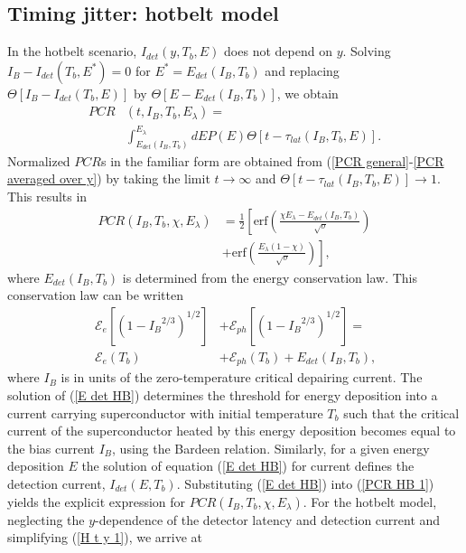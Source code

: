 \documentclass[%
reprint,
 amsmath,amssymb,
aps,
pra,
]{revtex4-1}
\begin{document}
\subsection{\label{sec:HBModel}Timing jitter: hotbelt model}

\quad In the hotbelt scenario, \(I_{det}\left(y, T_b,E\right)\) does not depend on \(y\). Solving \(I_B - I_{det}\left(T_b,E^*\right) = 0\) for \(E^*=E_{det}\left(I_B,T_b\right)\) and replacing \(\Theta\left[I_B-I_{det}(T_b,E)\right] \) by \(\Theta\left[E-E_{det}(I_B,T_b)\right] \), we obtain 
\begin{equation}\label{PCR HB}
\begin{aligned}
PCR&(t,I_B,T_b,E_\lambda)=\\
&\int_{E_{det}\left(I_B,T_b\right)}^{E_\lambda}dE P(E)\Theta\left[t - \tau_{lat}\left(I_B,T_b,E\right)\right].
\end{aligned}
\end{equation}
Normalized $PCR$s in the familiar form \cite{kozorezov_fano_2017} are obtained from (\ref{PCR general}-\ref{PCR averaged over y}) by taking the limit \(t \rightarrow \infty \) and \(\Theta\left[t - \tau_{lat}\left(I_B,T_b,E\right)\right]\rightarrow 1\).  This results in 
\begin{equation}\label{PCR HB 1}
\begin{aligned}
PCR(I_B,T_b,\chi,E_\lambda)&=\frac{1}{2}\left[\text{erf}\left(\frac{\chi E_\lambda - E_{det}\left(I_B,T_b\right)}{\sqrt[]{\sigma}}\right)\right.\\
&+\left. \text{erf}\left(\frac{E_\lambda\left(1 - \chi\right)}{\sqrt[]{\sigma}}\right)\right]\text{,}
\end{aligned}
\end{equation}
where \(E_{det}\left(I_B,T_b\right)\) is determined from the energy conservation law.  This conservation law can be written 
\begin{equation}\label{E det HB}
\begin{aligned}
\mathcal{E}_e\left[\left(1 - {I_B}^{2/3}\right)^{1/2}\right]& + \mathcal{E}_{ph}\left[\left(1 - {I_B}^{2/3}\right)^{1/2}\right] ={}\\
\mathcal{E}_e(T_b) &+ \mathcal{E}_{ph}(T_b) + E_{det}\left(I_B,T_b\right)\text{,}
\end{aligned}
\end{equation}
where \(I_B\) is in units of the zero-temperature critical depairing current. The solution of (\ref{E det HB}) determines the threshold for energy deposition into a current carrying superconductor with initial temperature \(T_b\) such that the critical current of the superconductor heated by this energy deposition becomes equal to the bias current \(I_B\),  using the Bardeen relation. Similarly, for a given energy deposition \(E\) the solution of equation (\ref{E det HB}) for current defines the detection current, \(I_{det}\left(E,T_b\right)\).  Substituting (\ref{E det HB}) into (\ref{PCR HB 1}) yields the explicit expression for \(PCR\left(I_B,T_b,\chi,E_\lambda\right)\).  For the hotbelt model, neglecting the $y$-dependence of the detector latency and detection current and simplifying (\ref{H t y 1}), we arrive at 
\end{document}
